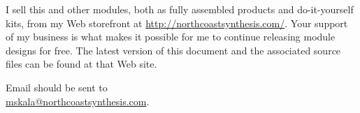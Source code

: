 I sell this and other modules, both as fully assembled products and
do-it-yourself kits, from my Web storefront at
\url{http://northcoastsynthesis.com/}.  Your support of my business is what
makes it possible for me to continue releasing module designs for free. 
The latest version of this document and the associated source files can be
found at that Web site.

Email should be sent to\\ \url{mskala@northcoastsynthesis.com}.
